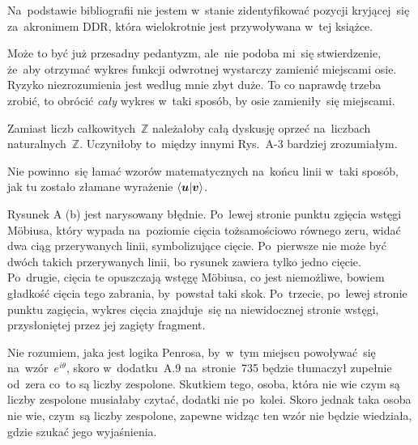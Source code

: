 \documentclass[a4paper,11pt]{article}
\begin{document}
\vspace{\spaceFour}


\start {} Na~podstawie bibliografii nie jestem w~stanie
zidentyfikować pozycji kryjącej~się za~akronimem DDR, która
wielokrotnie jest przywoływana w~tej książce.

\vspace{\spaceFour}


\start {} Może to być już przesadny pedantyzm, ale~nie podoba
mi~się stwierdzenie, że~aby otrzymać wykres funkcji odwrotnej
wystarczy zamienić miejscami osie. Ryzyko niezrozumienia jest według
mnie zbyt duże. To co naprawdę trzeba zrobić, to obrócić \textit{cały}
wykres w~taki sposób, by osie zamieniły~się miejscami.

\vspace{\spaceFour}


\start {} Zamiast liczb całkowitych~$\mathbb{Z}$ należałoby całą
dyskusję oprzeć na~liczbach naturalnych~$\mathbb{Z}$. Uczyniłoby to~między
innymi Rys.~A-3 bardziej zrozumiałym.

\vspace{\spaceFour}


\start {} Nie powinno~się łamać wzorów matematycznych
na~końcu linii w~taki sposób, jak tu zostało złamane wyrażenie
$\langle  \boldsymbol{u}  |  \boldsymbol{v}  \rangle$.

\vspace{\spaceFour}


\start {} Rysunek A (b) jest narysowany błędnie.
Po~lewej stronie punktu zgięcia wstęgi M\"{o}biusa, który wypada
na~poziomie cięcia tożsamościowo równego zeru, widać dwa ciąg
przerywanych linii, symbolizujące cięcie. Po~pierwsze nie może być
dwóch takich przerywanych linii, bo rysunek zawiera tylko jedno
cięcie. Po~drugie, cięcia te opuszczają wstęgę M\"{o}biusa, co jest
niemożliwe, bowiem gładkość cięcia tego zabrania, by~powstał taki
skok. Po~trzecie, po~lewej stronie punktu zagięcia, wykres cięcia
znajduje~się na niewidocznej stronie wstęgi, przysłoniętej przez jej
zagięty fragment.

\vspace{\spaceFour}


\start {} Nie rozumiem, jaka jest logika Penrosa, by~w~tym
miejscu powoływać~się na~wzór~$e^{ i \theta }$, skoro w~dodatku~A.9
na~stronie~735 będzie tłumaczył zupełnie od~zera co~to są liczby
zespolone. Skutkiem tego, osoba, która nie wie czym są liczby
zespolone musiałaby czytać, dodatki nie po~kolei. Skoro jednak taka
osoba nie wie, czym~są liczby zespolone, zapewne widząc ten wzór nie
będzie wiedziała, gdzie szukać jego wyjaśnienia.
\end{document}
